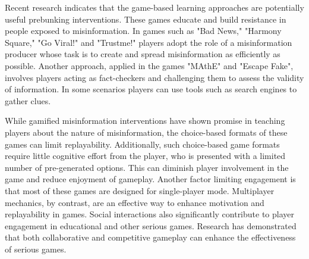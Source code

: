 





Recent research indicates that the game-based learning approaches are potentially useful prebunking interventions. These games educate and build resistance in people exposed to misinformation\cite{traberg2022psychological,kiili2024tackling}. In games such as "Bad News,"\cite{roozenbeek2019fake} "Harmony Square,"\cite{harmonysquare} "Go Viral!"\cite{camCambridgeGame} and "Trustme!"\cite{yang2021can} players adopt the role of a misinformation producer whose task is to create and spread misinformation as efficiently as possible. Another approach, applied in the games "MAthE"\cite{katsaounidou2019mathe} and "Escape Fake"\cite{escapefake}, involves players acting as fact-checkers and challenging them to assess the validity of information. In some scenarios players can use tools such as search engines to gather clues. 

While gamified misinformation interventions have shown promise in teaching players about the nature of misinformation, %
the choice-based formats of these games can limit replayability. %
Additionally, such choice-based game formats require little cognitive effort from the player, who is presented with a limited number of pre-generated options. This can diminish player involvement in the game and reduce enjoyment of gameplay. Another factor limiting engagement is that most of these games are designed for single-player mode. Multiplayer mechanics, by contrast, are an effective way to enhance motivation and replayability in games\cite{mustaro2012immersion}. Social interactions also significantly contribute to player engagement in educational and other serious games\cite{lepper2021intrinsic}. Research has demonstrated that both collaborative and competitive gameplay can enhance the effectiveness of serious games\cite{cagiltay2015effect,bellotti2010designing}.

